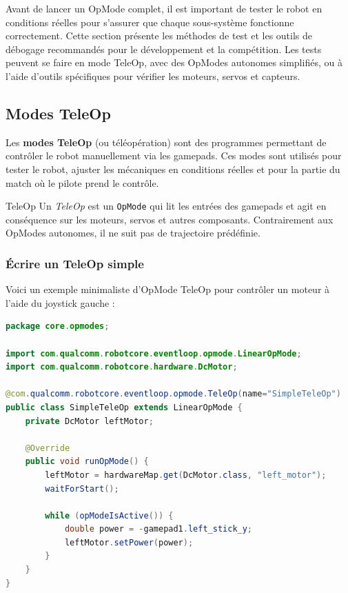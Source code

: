 \documentclass[12pt, a4paper]{report}
\begin{document}
    Avant de lancer un OpMode complet, il est important de tester le robot en conditions réelles pour s'assurer que chaque sous-système fonctionne correctement. Cette section présente les méthodes de test et les outils de débogage recommandés pour le développement et la compétition. Les tests peuvent se faire en mode TeleOp, avec des OpModes autonomes simplifiés, ou à l'aide d'outils spécifiques pour vérifier les moteurs, servos et capteurs.


    \subsection{Modes TeleOp}


    Les \textbf{modes TeleOp} (ou téléopération) sont des programmes permettant de contrôler le robot manuellement via les gamepads. Ces modes sont utilisés pour tester le robot, ajuster les mécaniques en conditions réelles et pour la partie du match où le pilote prend le contrôle.

    \begin{mydefinition}{TeleOp}
        Un \textit{TeleOp} est un \texttt{OpMode} qui lit les entrées des gamepads et agit en conséquence sur les moteurs, servos et autres composants. Contrairement aux OpModes autonomes, il ne suit pas de trajectoire prédéfinie.
    \end{mydefinition}


    \subsubsection*{Écrire un TeleOp simple}

    Voici un exemple minimaliste d’OpMode TeleOp pour contrôler un moteur à l’aide du joystick gauche :

    \begin{lstlisting}[language=Java]
package core.opmodes;

import com.qualcomm.robotcore.eventloop.opmode.LinearOpMode;
import com.qualcomm.robotcore.hardware.DcMotor;

@com.qualcomm.robotcore.eventloop.opmode.TeleOp(name="SimpleTeleOp")
public class SimpleTeleOp extends LinearOpMode {
    private DcMotor leftMotor;

    @Override
    public void runOpMode() {
        leftMotor = hardwareMap.get(DcMotor.class, "left_motor");
        waitForStart();

        while (opModeIsActive()) {
            double power = -gamepad1.left_stick_y;
            leftMotor.setPower(power);
        }
    }
}
    \end{lstlisting}
\end{document}
